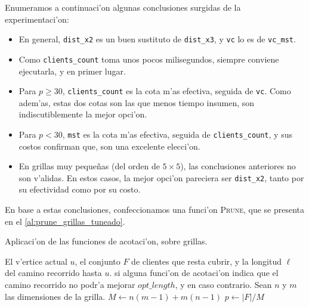 Enumeramos a continuaci'on algunas conclusiones surgidas de la experimentaci'on:

\begin{itemize}
\item En general, \texttt{dist\_x2} es un buen sustituto de \texttt{dist\_x3}, y \texttt{vc} lo es de \texttt{vc\_mst}.

\item Como \texttt{clients\_count} toma unos pocos milisegundos, siempre conviene ejecutarla, y en primer lugar.

\item Para $p \geq 30$, \texttt{clients\_count} es la cota m'as efectiva, seguida de \texttt{vc}. Como adem'as, estas dos cotas son las que menos tiempo insumen, son indiscutiblemente la mejor opci'on.

\item Para $p < 30$, \texttt{mst} es la cota m'as efectiva, seguida de \texttt{clients\_count}, y sus costos confirman que, son una excelente elecci'on.

\item En grillas muy peque\~nas (del orden de $5 \times 5$), las conclusiones anteriores no son v'alidas. En estos casos, la mejor opci'on pareciera ser \texttt{dist\_x2}, tanto por su efectividad como por su costo.
\end{itemize}

En base a estas conclusiones, confeccionamos una funci'on \textsc{Prune}, que se presenta en el \autoref{al:prune_grillas_tuneado}.

\begin{algorithm}
  \caption{Aplicaci'on de las funciones de acotaci'on, sobre grillas.}
  \label{al:prune_grillas_tuneado}
  \begin{algorithmic}[1]
  	\Require El v'ertice actual $u$, el conjunto $F$ de clientes que resta cubrir, y la longitud $\ell$ del camino recorrido hasta $u$.
  	\Ensure \True si alguna funci'on de acotaci'on indica que el camino recorrido no podr'a mejorar $opt\_length$, y \False en caso contrario.
	\State Sean $n$ y $m$ las dimensiones de la grilla.
	\State $M \gets n(m - 1) + m(n - 1)$ 
	\State $p \gets |F| / M$
	 
			\Return \True
		\EndIf
	\Else
			\Return \True
			\Return \True
		\EndIf
	\EndIf
	\Return \False
	\EndFunction
  \end{algorithmic}
\end{algorithm}

